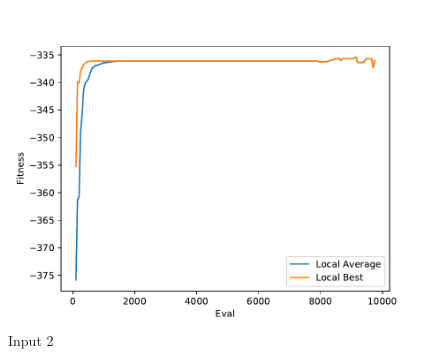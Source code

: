 \documentclass{standalone}
\begin{document}
\begin{figure}[!htb]
	\caption{Input 2}
	\label{fig:graph_2047}
	\includegraphics[width=\textwidth]{../graphs/graphs/2047.pdf}
\end{figure}
\end{document}
